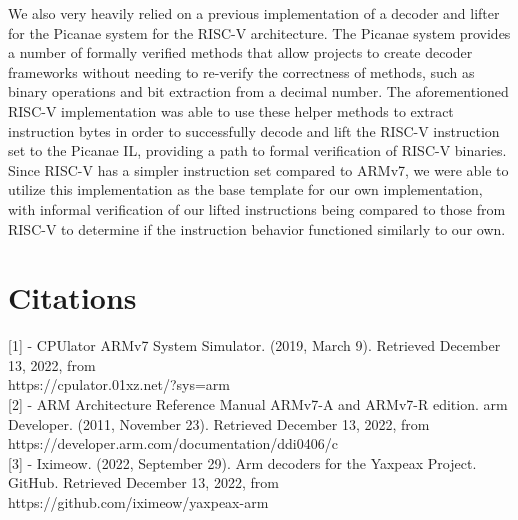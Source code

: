 \documentclass{article}
\begin{document}
\begin{multicols}{2}
We also very heavily relied on a previous implementation of a decoder and lifter for the Picanae system for the RISC-V architecture. The Picanae system provides a number of formally verified methods that allow projects to create decoder frameworks without needing to re-verify the correctness of methods, such as binary operations and bit extraction from a decimal number. The aforementioned RISC-V implementation was able to use these helper methods to extract instruction bytes in order to successfully decode and lift the RISC-V instruction set to the Picanae IL, providing a path to formal verification of RISC-V binaries. Since RISC-V has a simpler instruction set compared to ARMv7, we were able to utilize this implementation as the base template for our own implementation, with informal verification of our lifted instructions being compared to those from RISC-V to determine if the instruction behavior functioned similarly to our own.

\section*{\centering Citations}
\vspace{0.3cm}

[1] - CPUlator ARMv7 System Simulator. (2019, March 9). Retrieved December 13, 2022, from \\https://cpulator.01xz.net/?sys=arm\\

[2] - ARM Architecture Reference Manual ARMv7-A and ARMv7-R edition. arm Developer. (2011, November 23). Retrieved December 13, 2022, from https://developer.arm.com/documentation/ddi0406/c\\

[3] - Iximeow. (2022, September 29). Arm decoders for the Yaxpeax Project. GitHub. Retrieved December 13, 2022, from https://github.com/iximeow/yaxpeax-arm
\end{multicols}
\end{document}
